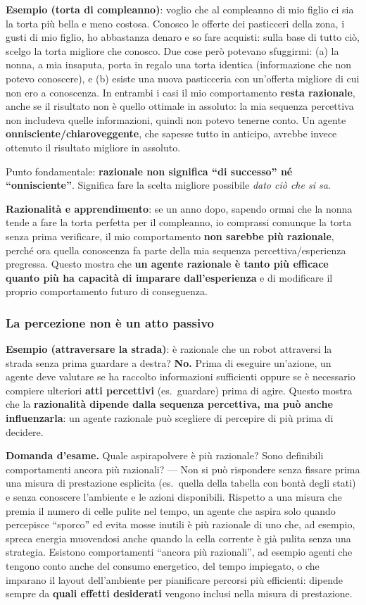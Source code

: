 \documentclass[11pt,a4paper]{report}
\newcommand{\domandaesame}[1]{\begin{esame}\textbf{Domanda d'esame.} #1\end{esame}}
\begin{document}
\textbf{Esempio (torta di compleanno)}: voglio che al compleanno di mio figlio ci sia la torta più bella e meno costosa. Conosco le offerte dei pasticceri della zona, i gusti di mio figlio, ho abbastanza denaro e so fare acquisti: sulla base di tutto ciò, scelgo la torta migliore che conosco. Due cose però potevano sfuggirmi: (a) la nonna, a mia insaputa, porta in regalo una torta identica (informazione che non potevo conoscere), e (b) esiste una nuova pasticceria con un'offerta migliore di cui non ero a conoscenza. In entrambi i casi il mio comportamento \textbf{resta razionale}, anche se il risultato non è quello ottimale in assoluto: la mia sequenza percettiva non includeva quelle informazioni, quindi non potevo tenerne conto. Un agente \textbf{onnisciente/chiaroveggente}, che sapesse tutto in anticipo, avrebbe invece ottenuto il risultato migliore in assoluto.

Punto fondamentale: \textbf{razionale non significa ``di successo'' né ``onnisciente''}. Significa fare la scelta migliore possibile \emph{dato ciò che si sa}.

\textbf{Razionalità e apprendimento}: se un anno dopo, sapendo ormai che la nonna tende a fare la torta perfetta per il compleanno, io comprassi comunque la torta senza prima verificare, il mio comportamento \textbf{non sarebbe più razionale}, perché ora quella conoscenza fa parte della mia sequenza percettiva/esperienza pregressa. Questo mostra che \textbf{un agente razionale è tanto più efficace quanto più ha capacità di imparare dall'esperienza} e di modificare il proprio comportamento futuro di conseguenza.

\subsubsection*{La percezione non è un atto passivo}

\textbf{Esempio (attraversare la strada)}: è razionale che un robot attraversi la strada senza prima guardare a destra? \textbf{No.} Prima di eseguire un'azione, un agente deve valutare se ha raccolto informazioni sufficienti oppure se è necessario compiere ulteriori \textbf{atti percettivi} (es.\ guardare) prima di agire. Questo mostra che la \textbf{razionalità dipende dalla sequenza percettiva, ma può anche influenzarla}: un agente razionale può scegliere di percepire di più prima di decidere.

\domandaesame{Quale aspirapolvere è più razionale? Sono definibili comportamenti ancora più razionali? --- Non si può rispondere senza fissare prima una misura di prestazione esplicita (es.\ quella della tabella con bontà degli stati) e senza conoscere l'ambiente e le azioni disponibili. Rispetto a una misura che premia il numero di celle pulite nel tempo, un agente che aspira solo quando percepisce ``sporco'' ed evita mosse inutili è più razionale di uno che, ad esempio, spreca energia muovendosi anche quando la cella corrente è già pulita senza una strategia. Esistono comportamenti ``ancora più razionali'', ad esempio agenti che tengono conto anche del consumo energetico, del tempo impiegato, o che imparano il layout dell'ambiente per pianificare percorsi più efficienti: dipende sempre da \textbf{quali effetti desiderati} vengono inclusi nella misura di prestazione.}
\end{document}
